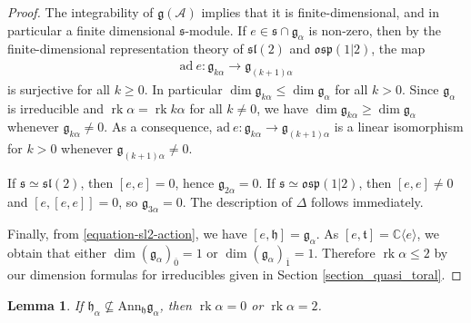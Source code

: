\documentclass[12pt, a4paper, reqno]{amsart}
\def\l{\mathfrak{l}}
\def\s{\mathfrak{s}}
\def\ol{\overline}
\def\rk{\operatorname{rk}}
\newtheorem{lemma}{Lemma}
\theoremstyle{definition}
\theoremstyle{definition}
\theoremstyle{definition}
\numberwithin{theorem}{section}
\numberwithin{lemma}{section}
\numberwithin{remark}{section}
\numberwithin{definition}{section}
\numberwithin{corollary}{section}
\numberwithin{proposition}{section}
\numberwithin{example}{section}
\begin{document}
	\begin{proof}
		The integrability of \(\mathfrak{g}(\mathcal{A})\) implies that it is finite-dimensional, and in particular a finite dimensional \(\mathfrak{s}\)-module. If \(e \in \mathfrak{s}\cap \mathfrak{g}_{\alpha}\) is non-zero, then by the finite-dimensional representation theory of \(\s\l(2)\) and \(\mathfrak{osp}(1|2)\), the map
		\begin{align}\label{equation-sl2-action}
			\mathrm{ad}\ e : \mathfrak{g}_{k\alpha} \rightarrow \mathfrak{g}_{(k+1)\alpha}
		\end{align}
		is surjective for all \(k \geq 0\). In particular \(\dim \mathfrak{g}_{k\alpha} \leq \dim \mathfrak{g}_{\alpha}\) for all \(k > 0\). Since \(\mathfrak{g}_{\alpha}\) is irreducible and \(\rk\alpha = \rk k\alpha\) for all \(k\neq 0\), we have \(\dim \mathfrak{g}_{k\alpha} \geq \dim \mathfrak{g}_{\alpha}\) whenever \(\mathfrak{g}_{k\alpha} \neq 0\). As a consequence, \(\mathrm{ad}\ e : \mathfrak{g}_{k\alpha} \rightarrow \mathfrak{g}_{(k+1)\alpha}\) is a linear isomorphism for \(k > 0\) whenever \(\mathfrak{g}_{(k+1)\alpha}\neq 0\). \par
		If \(\mathfrak{s}\simeq \s\l(2)\), then \([e,e] = 0\), hence \(\mathfrak{g}_{2\alpha} = 0\). If \(\mathfrak{s}\simeq \mathfrak{osp}(1|2)\), then \([e,e]\neq 0\) and \([e,[e,e]] = 0\), so \(\mathfrak{g}_{3\alpha} = 0\). The description of \(\Delta\) follows immediately. \par
		Finally, from \eqref{equation-sl2-action}, we have \([e,\mathfrak{h}] = \mathfrak{g}_{\alpha}\). As \([e,\mathfrak{t}] = \mathbb{C}\langle e\rangle\), we obtain that either \(\dim (\mathfrak{g}_\alpha)_{\ol{0}} = 1\) or \(\dim (\mathfrak{g}_\alpha)_{\ol{1}} = 1\). Therefore \(\rk\alpha \leq 2\) by our dimension formulas for irreducibles given in Section \ref{section_quasi_toral}.
	\end{proof}
	\begin{lemma}\label{lemma-rk0-rk2}
		If \(\mathfrak{h}_{\alpha} \nsubseteq \mathrm{Ann}_{\mathfrak{h}}\mathfrak{g}_{\alpha}\), then \(\rk\alpha = 0\) or \(\rk\alpha = 2\).
	\end{lemma}
\end{document}
